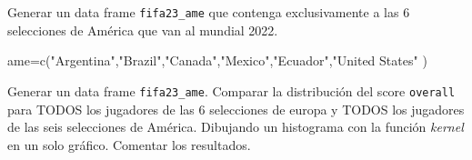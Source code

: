 \documentclass[
]{article}
\newenvironment{Shaded}{\begin{snugshade}}{\end{snugshade}}
\newcommand{\FunctionTok}[1]{\textcolor[rgb]{0.00,0.00,0.00}{#1}}
\newcommand{\NormalTok}[1]{#1}
\newcommand{\OtherTok}[1]{\textcolor[rgb]{0.56,0.35,0.01}{#1}}
\newcommand{\StringTok}[1]{\textcolor[rgb]{0.31,0.60,0.02}{#1}}
\begin{document}
Generar un data frame \texttt{fifa23\_ame} que contenga exclusivamente a
las 6 selecciones de América que van al mundial 2022.

\begin{Shaded}
\begin{Highlighting}[]
\NormalTok{ame}\OtherTok{=}\FunctionTok{c}\NormalTok{(}\StringTok{"Argentina"}\NormalTok{,}\StringTok{"Brazil"}\NormalTok{,}\StringTok{"Canada"}\NormalTok{,}\StringTok{"Mexico"}\NormalTok{,}\StringTok{"Ecuador"}\NormalTok{,}\StringTok{"United States"}\NormalTok{ )}
\end{Highlighting}
\end{Shaded}

Generar un data frame \texttt{fifa23\_ame}. Comparar la distribución del
score \texttt{overall} para TODOS los jugadores de las 6 selecciones de
europa y TODOS los jugadores de las seis selecciones de América.
Dibujando un histograma con la función \emph{kernel} en un solo gráfico.
Comentar los resultados.
\end{document}
